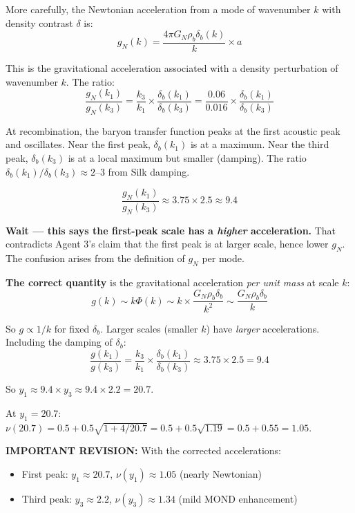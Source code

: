 \documentclass[11pt,a4paper]{article}
\begin{document}
More carefully, the Newtonian acceleration from a mode of wavenumber $k$ with density contrast $\delta$ is:
\begin{equation}
g_N(k) = \frac{4\pi G_N \rho_b \delta_b(k)}{k} \times a
\end{equation}

This is the gravitational acceleration associated with a density perturbation of wavenumber $k$. The ratio:
\begin{equation}
\frac{g_N(k_1)}{g_N(k_3)} = \frac{k_3}{k_1}\times\frac{\delta_b(k_1)}{\delta_b(k_3)} = \frac{0.06}{0.016}\times\frac{\delta_b(k_1)}{\delta_b(k_3)}
\end{equation}

At recombination, the baryon transfer function peaks at the first acoustic peak and oscillates. Near the first peak, $\delta_b(k_1)$ is at a maximum. Near the third peak, $\delta_b(k_3)$ is at a local maximum but smaller (damping). The ratio $\delta_b(k_1)/\delta_b(k_3) \approx 2$--$3$ from Silk damping.

\begin{equation}
\frac{g_N(k_1)}{g_N(k_3)} \approx 3.75 \times 2.5 \approx 9.4
\end{equation}

\textbf{Wait --- this says the first-peak scale has a \emph{higher} acceleration.} That contradicts Agent 3's claim that the first peak is at larger scale, hence lower $g_N$. The confusion arises from the definition of $g_N$ per mode.

\textbf{The correct quantity} is the gravitational acceleration \emph{per unit mass} at scale $k$:
\begin{equation}
g(k) \sim k \Phi(k) \sim k \times \frac{G_N \rho_b \delta_b}{k^2} \sim \frac{G_N \rho_b \delta_b}{k}
\end{equation}

So $g \propto 1/k$ for fixed $\delta_b$. Larger scales (smaller $k$) have \emph{larger} accelerations. Including the damping of $\delta_b$:
\begin{equation}
\frac{g(k_1)}{g(k_3)} = \frac{k_3}{k_1}\times\frac{\delta_b(k_1)}{\delta_b(k_3)} \approx 3.75 \times 2.5 = 9.4
\end{equation}

So $y_1 \approx 9.4 \times y_3 \approx 9.4 \times 2.2 = 20.7$.

At $y_1 = 20.7$: $\nu(20.7) = 0.5 + 0.5\sqrt{1 + 4/20.7} = 0.5 + 0.5\sqrt{1.19} = 0.5 + 0.55 = 1.05$.

\textbf{IMPORTANT REVISION:} With the corrected accelerations:
\begin{itemize}
\item First peak: $y_1 \approx 20.7$, $\nu(y_1) \approx 1.05$ (nearly Newtonian)
\item Third peak: $y_3 \approx 2.2$, $\nu(y_3) \approx 1.34$ (mild MOND enhancement)
\end{itemize}
\end{document}

